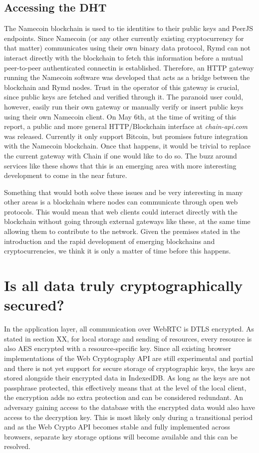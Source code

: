 \subsection{Accessing the DHT}
The Namecoin blockchain is used to tie identities to their public keys and PeerJS endpoints. Since Namecoin (or any other currently existing cryptocurrency for that matter) communicates using their own binary data protocol\cite{BitcoinSource:2014:Online}, Rymd can not interact directly with the blockchain to fetch this information before a mutual peer-to-peer authenticated connectin is established. Therefore, an HTTP gateway running the Namecoin software was developed that acts as a bridge between the blockchain and Rymd nodes. Trust in the operator of this gateway is crucial, since public keys are fetched and verified through it. The paranoid user could, however, easily run their own gateway or manually verify or insert public keys using their own Namecoin client. On May 6th, at the time of writing of this report, a public and more general HTTP/Blockchain interface at \emph{chain-api.com}\cite{Chain:2014:Online} was released. Currently it only support Bitcoin, but promises future integration with the Namecoin blockchain. Once that happens, it would be trivial to replace the current gateway with Chain if one would like to do so. The buzz around services like these shows that this is an emerging area with more interesting development to come in the near future.

Something that would both solve these issues and be very interesting in many other areas is a blockchain where nodes can communicate through open web protocols. This would mean that web clients could interact directly with the blockchain without going through external gateways like these, at the same time allowing them to contribute to the network. Given the premises stated in the introduction and the rapid development of emerging blockchains and cryptocurrencies, we think it is only a matter of time before this happens.

\section{Is all data truly cryptographically secured?}
In the application layer, all communication over WebRTC is DTLS encrypted. As stated in section XX, for local storage and sending of resources, every resource is also AES encrypted with a resource-specific key. Since all existing browser implementations of the Web Cryptography API are still experimental and partial and there is not yet support for secure storage of cryptographic keys, the keys are stored alongside their encrypted data in IndexedDB. As long as the keys are not passphrase protected, this effectively means that at the level of the local client, the encryption adds no extra protection and can be considered redundant. An adversary gaining access to the database with the encrypted data would also have access to the decryption key. This is most likely only during a transitional period and as the Web Crypto API becomes stable and fully implemented across browsers, separate key storage options will become available and this can be resolved.

